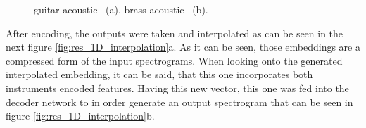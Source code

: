 \begin{figure}[htb!]
    \centering
    \caption{guitar acoustic ~(a), brass acoustic ~(b).}
    \label{fig:res_1D_input_interpolation}
\end{figure}

After encoding, the outputs were taken and interpolated as can be seen in the next figure \ref{fig:res_1D_interpolation}a. As it can be seen, those embeddings are a compressed form of the input spectrograms. When looking onto the generated interpolated embedding, it can be said, that this one incorporates both instruments encoded features. Having this new vector, this one was fed into the decoder network to in order generate an output spectrogram that can be seen in figure \ref{fig:res_1D_interpolation}b. 

